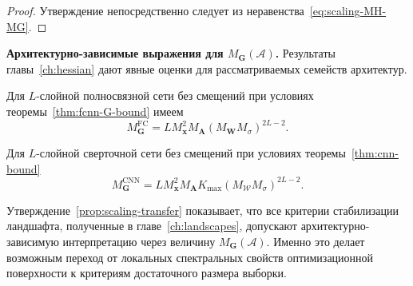 \begin{proof}
    Утверждение непосредственно следует из неравенства~\eqref{eq:scaling-MH-MG}.
\end{proof}

\textbf{Архитектурно-зависимые выражения для $M_{\mathbf G}(\mathcal A)$.}
Результаты главы~\ref{ch:hessian} дают явные оценки для рассматриваемых семейств архитектур.

Для $L$-слойной полносвязной сети без смещений при условиях теоремы~\ref{thm:fcnn-G-bound} имеем
\begin{equation}
    \label{eq:scaling-MG-fcnn}
    M_{\mathbf G}^{\mathrm{FC}}
    =
    L M_{\mathbf x}^2 M_{\mathbf A}(M_{\mathbf W}M_{\sigma})^{2L-2}.
\end{equation}

Для $L$-слойной сверточной сети без смещений при условиях теоремы~\ref{thm:cnn-bound}
\begin{equation}
    \label{eq:scaling-MG-cnn}
    M_{\mathbf G}^{\mathrm{CNN}}
    =
    L M_{\mathbf x}^2 M_{\mathbf A} K_{\max}(M_{\mathcal W}M_{\sigma})^{2L-2}.
\end{equation}


Утверждение~\ref{prop:scaling-transfer} показывает, что все критерии стабилизации ландшафта, полученные в главе~\ref{ch:landscapes}, допускают архитектурно-зависимую интерпретацию через величину $M_{\mathbf G}(\mathcal A)$. Именно это делает возможным переход от локальных спектральных свойств оптимизационной поверхности к критериям достаточного размера выборки.

